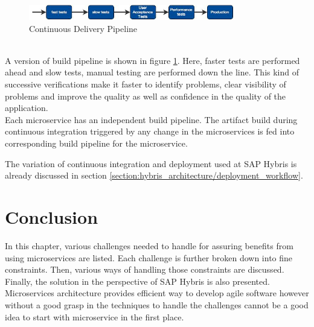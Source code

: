 \begin{enumerate}
\\
\begin{figure}[H]
\begin{center}
\includegraphics[width=0.8\textwidth]{figures/challenges_six_continuous_delivery}
\caption{Continuous Delivery Pipeline \cite{Newman:2015aa}}
\label{fig:challanges_of_microservices_architecture/deployment/continuous_delivery}
\end{center}
\end{figure}
\\
A version of build pipeline is shown in figure \ref{fig:challanges_of_microservices_architecture/deployment/continuous_delivery}. Here, faster tests are performed ahead and slow tests, manual testing are performed down the line. This kind of successive verifications make it faster to identify problems, clear visibility of problems and improve the quality as well as confidence in the quality of the application.\\
Each microservice has an independent build pipeline. The artifact build during continuous integration triggered by any change in the microservices is fed into corresponding build pipeline for the microservice. \cite{Newman:2015aa} \cite{Fowler:2013aa}
\end{enumerate}

\begin{shaded}
The variation of continuous integration and deployment used at SAP Hybris is already discussed in section \ref{section:hybris_architecture/deployment_workflow}.
\end{shaded}

\section{Conclusion}\label{section:challanges_of_microservices_architecture/conclusion}
In this chapter, various challenges needed to handle for assuring benefits from using microservices are listed. Each challenge is further broken down into fine constraints. Then, various ways of handling those constraints are discussed. Finally, the solution in the perspective of SAP Hybris is also presented. Microservices architecture provides efficient way to develop agile software however without a good grasp in the techniques to handle the challenges cannot be a good idea to start with microservice in the first place.













